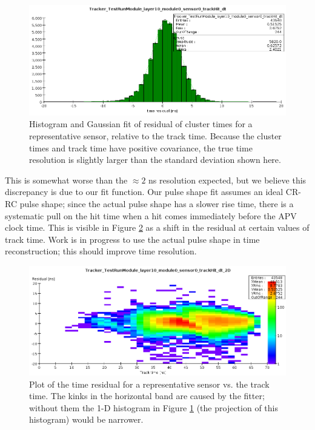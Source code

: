 \begin{figure}[ht]
	\includegraphics[width=\textwidth]{test2012/svtperformance/timeres}
	\caption{\small{Histogram and Gaussian fit of residual of cluster times for a representative sensor, relative to the track time. Because the cluster times and track time have positive covariance, the true time resolution is slightly larger than the standard deviation shown here.} }
	\label{fig:timeres}
\end{figure}


This is somewhat worse than the $\approx 2$ ns resolution expected, but we believe this discrepancy is due to our fit function. Our pulse shape fit assumes an ideal CR-RC pulse shape; since the actual pulse shape has a slower rise time, there is a systematic pull on the hit time when a hit comes immediately before the APV clock time. 
This is visible in Figure \ref{fig:timeres_2D} as a shift in the residual at certain values of track time.
Work is in progress to use the actual pulse shape in time reconstruction; this should improve time resolution.

\begin{figure}[ht]
	\includegraphics[width=\textwidth]{test2012/svtperformance/timeres_2D}
	\caption{\small{Plot of the time residual for a representative sensor vs. the track time. 
		The kinks in the horizontal band are caused by the fitter; without them the 1-D histogram in Figure \ref{fig:timeres} (the projection of this histogram) would be narrower.} }
	\label{fig:timeres_2D}
\end{figure}

